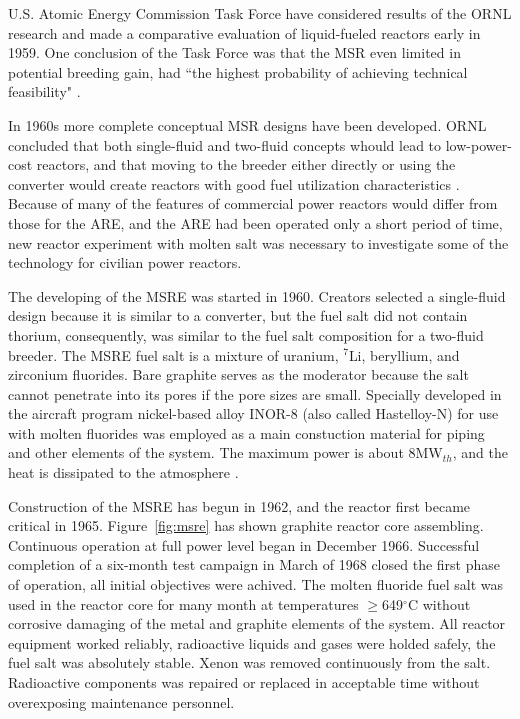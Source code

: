 U.S. Atomic Energy Commission Task Force have considered results of the \gls{ORNL} research and made a comparative evaluation of liquid-fueled reactors early in 1959. One conclusion of the Task Force was that the \gls{MSR} even limited in potential breeding gain, had ``the highest probability of achieving technical feasibility" \cite{noauthor_report_1959}.

In 1960s more complete conceptual \gls{MSR} designs have been developed. \gls{ORNL} concluded that both single-fluid and two-fluid concepts whould lead to low-power-cost reactors, and that moving to the breeder either directly or using the converter would create reactors with good fuel utilization characteristics \cite{rosenthal_molten-salt_1970}. Because of many of the features of commercial power reactors would differ from those for the \gls{ARE}, and the \gls{ARE} had been operated only a short period of time, new reactor experiment with molten salt was necessary to investigate some of the technology for civilian power reactors.

The developing of the \gls{MSRE} was started in 1960. Creators selected a single-fluid design because it is similar to a converter, but the fuel salt did not contain thorium, consequently, was similar to the fuel salt composition for a two-fluid breeder. The \gls{MSRE} fuel salt is a mixture of uranium, $^7$Li, beryllium, and zirconium fluorides. Bare graphite serves as the moderator because the salt cannot penetrate into its pores if the pore sizes are small. Specially developed in the aircraft program nickel-based alloy INOR-8 (also called Hastelloy-N) for use with molten fluorides was employed as a main constuction material for piping and other elements of the system. The maximum power is about 8MW$_{th}$, and the heat is dissipated to the atmosphere \cite{haubenreich_experience_1970}.

Construction of the \gls{MSRE} has begun in 1962, and the reactor first became critical in 1965. Figure~\ref{fig:msre} has shown graphite reactor core assembling. Continuous operation at full power level began in December 1966. Successful completion of a six-month test campaign in March of 1968 closed the first phase of operation, all initial objectives were achived. The molten fluoride fuel salt was used in the reactor core for many month at temperatures $\geq$649$^{\circ}$C without corrosive damaging of the metal and graphite elements of the system. All reactor equipment worked reliably, radioactive liquids and gases were holded safely, the fuel salt was absolutely stable. Xenon was removed continuously from the salt. Radioactive components was repaired or replaced in acceptable time without overexposing maintenance personnel.

